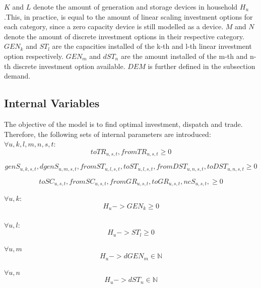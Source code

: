 \documentclass[
	11pt,								%
	DIV10,								%
	a4paper,         					%
	oneside,							%
	headheight=20pt,					%
	footheight=20pt,					%
    parskip=full,						%
    listof=totoc,						%
	bibliography=totoc,					%
	index=totoc,						%
]{scrartcl}
\begin{document}
$K$ and $L$ denote the amount of generation and storage devices in household $H_u$.This, in practice, is equal to the amount of linear scaling investment options for each category, since a zero capacity device is still modelled as a device. $M$ and $N$ denote the amount of discrete investment options in their respective category. $GEN_k$ and $ST_l$ are the capacities installed of the k-th and l-th linear investment option respectively. $GEN_m$ and $dST_n$ are the amount installed of the m-th and n-th discrete investment option available. $DEM$ is further defined in the subsection demand.





\subsection{Internal Variables}
The objective of the model is to find optimal investment, dispatch and trade. Therefore, the following sets of internal parameters are introduced:
	\\
	$\forall u,k,l,m,n,s,t$:
	\\
	\begin{equation}
		toTR_{u,s,t}, fromTR_{u,s,t} \geq 0
	\end{equation}
	
	\begin{equation}
		genS_{u,k,s,t}, dgenS_{u,m,s,t}, fromST_{u,l,s,t}, toST_{u,l,s,t}, fromDST_{u,n,s,t}, toDST_{u,n,s,t} \geq 0
	\end{equation}
	
	\begin{equation}
		toSC_{u,s,t}, fromSC_{u,s,t}, fromGR_{u,s,t}, toGR_{u,s,t}, ncS_{u,s,t},  \geq 0
	\end{equation}
	
	
	$\forall u,k$:
	\begin{equation}
		H_u->GEN_k \geq 0
	\end{equation}
	\\
	$\forall u,l$:
	\begin{equation}
		H_u->ST_l \geq 0
	\end{equation}
	
	$\forall u,m$
	\begin{equation}
		H_u->dGEN_m \in \mathbb{N}
	\end{equation}
	
	$\forall u,n$
	\begin{equation}
		H_u->dST_n \in \mathbb{N}
	\end{equation}
\end{document}
